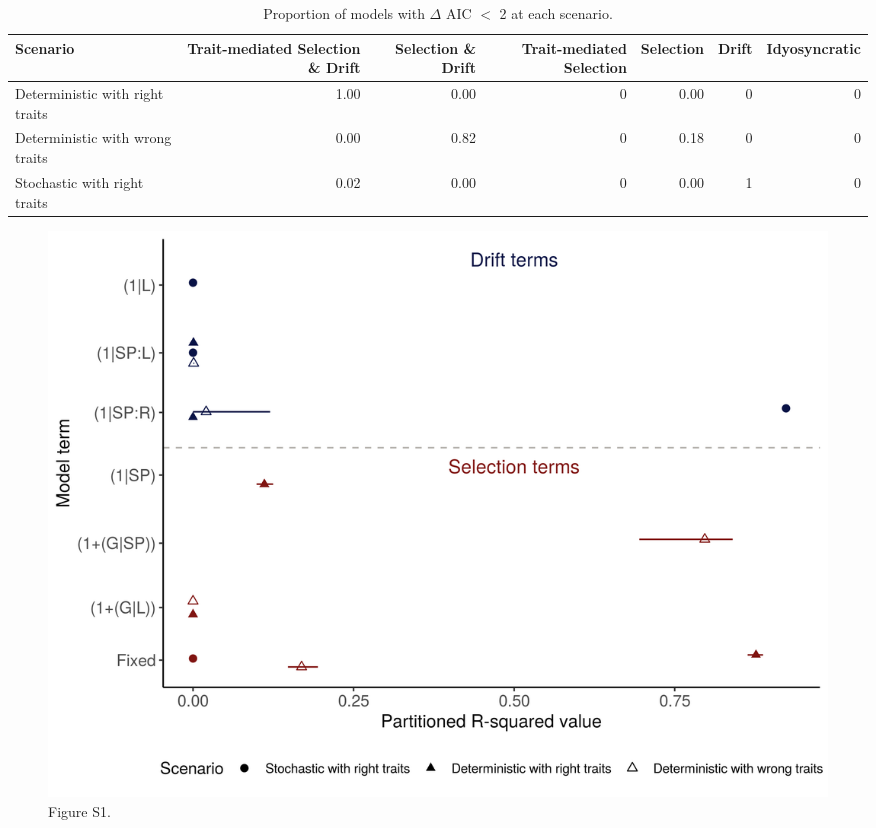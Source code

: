 \begin{table}

\caption{\label{tab:table-prop}Proportion of models with {$\Delta$} AIC {$<$}  2 at each scenario.}
\centering
\begin{tabular}[t]{lrrrrrr}
\hline
Scenario & Trait-mediated Selection \& Drift & Selection \& Drift & Trait-mediated Selection & Selection & Drift & Idyosyncratic\\
\hline
Deterministic with right traits & 1.00 & 0.00 & 0 & 0.00 & 0 & 0\\
\hline
Deterministic with wrong traits & 0.00 & 0.82 & 0 & 0.18 & 0 & 0\\
\hline
Stochastic with right traits & 0.02 & 0.00 & 0 & 0.00 & 1 & 0\\
\hline
\end{tabular}
\end{table}

\begin{figure}
\centering
\includegraphics{fig/S1.png}
\caption{Figure S1.}
\end{figure}


